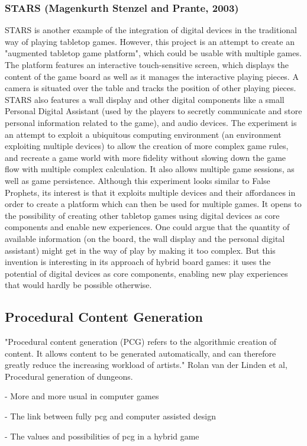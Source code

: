 \subsubsection{STARS (Magenkurth Stenzel and Prante, 2003)}
STARS is another example of the integration of digital devices in the traditional way of playing tabletop games. However, this project is an attempt to create an "augmented tabletop game platform", which could be usable with multiple games. The platform features an interactive touch-sensitive screen, which displays the content of the game board as well as it manages the interactive playing pieces. A camera is situated over the table and tracks the position of other playing pieces. STARS also features a wall display and other digital components like a small Personal Digital Assistant (used by the players to secretly communicate and store personal information related to the game), and audio devices. The experiment is an attempt to exploit a ubiquitous computing environment (an environment exploiting multiple devices) to allow the creation of more complex game rules, and recreate a game world with more fidelity without slowing down the game flow with multiple complex calculation. It also allows multiple game sessions, as well as game persistence. Although this experiment looks similar to False Prophets, its interest is that it exploits multiple devices and their affordances in order to create a platform which can then be used for multiple games. It opens to the possibility of creating other tabletop games using digital devices as core components and enable new experiences. One could argue that the quantity of available information (on the board, the wall display and the personal digital assistant) might get in the way of play by making it too complex. But this invention is interesting in its approach of hybrid board games: it uses the potential of digital devices as core components, enabling new play experiences that would hardly be possible otherwise.
\subsection{Procedural Content Generation}
"Procedural content generation (PCG) refers to the algorithmic creation of content. It allows content to be generated automatically, and can therefore greatly reduce the increasing workload of artists." Rolan van der Linden et al, Procedural generation of dungeons.

- More and more usual in computer games

- The link between fully pcg and computer assisted design

- The values and possibilities of pcg in a hybrid game

